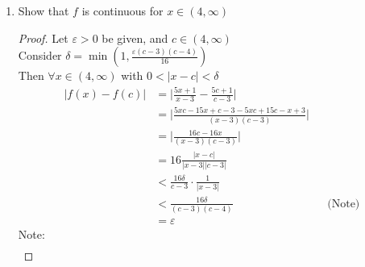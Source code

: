 \documentclass[12pt]{article}
\begin{document}
\begin{enumerate}
\begin{enumerate}
\begin{proof}
\begin{align*}
                      |f(x) - f(4)| &= \bigg| \frac{5x+1}{x-3} - 21 \bigg| \\
                      &=\bigg| \frac{5x+1}{x-3} - \frac{21x-63}{x-3} \bigg| \\
                      &= \bigg| \frac{-16x+64}{x-3} \bigg| \\
                      &= 16\frac{|4-x|}{|x-3|} \\
                      &< 16\delta \frac{1}{|x-3|} \\
                      &< 32\delta && \text{(Note)} \\
                      &= \varepsilon
                  \end{align*}
                  Note:
                  \begin{gather*}
                      -\frac{1}{2} < x-4 < \frac{1}{2} \\
                      \frac{1}{2} < x-3 < \frac{3}{2} \\
                      |x-3| = x-3 > \frac{1}{2}
                  \end{gather*}
              \end{proof}
              \item Show that $f$ is continuous for $x \in (4, \infty)$
              \begin{proof}
                  Let $\varepsilon > 0$ be given, and $c \in (4, \infty)$ \\
                  Consider $\delta = \min(1, \frac{\varepsilon(c-3)(c-4)}{16})$ \\
                  Then $\forall x \in (4, \infty)$ with $0 < |x-c| < \delta$
                  \begin{align*}
                      |f(x) - f(c)| &= \bigg| \frac{5x+1}{x-3} - \frac{5c+1}{c-3} \bigg| \\
                      &= \bigg| \frac{5xc-15x+c-3-5xc+15c-x+3}{(x-3)(c-3)} \bigg| \\
                      &= \bigg| \frac{16c-16x}{(x-3)(c-3)} \bigg| \\
                      &= 16\frac{|x-c|}{|x-3||c-3|} \\
                      &< \frac{16\delta}{c-3} \cdot \frac{1}{|x-3|} \\
                      &< \frac{16\delta}{(c-3)(c-4)}  && \text{(Note)}\\
                      &= \varepsilon
                  \end{align*}
                  Note: 
                  \begin{align*}

\end{align*}
\end{proof}
\end{enumerate}
\end{enumerate}
\end{document}
